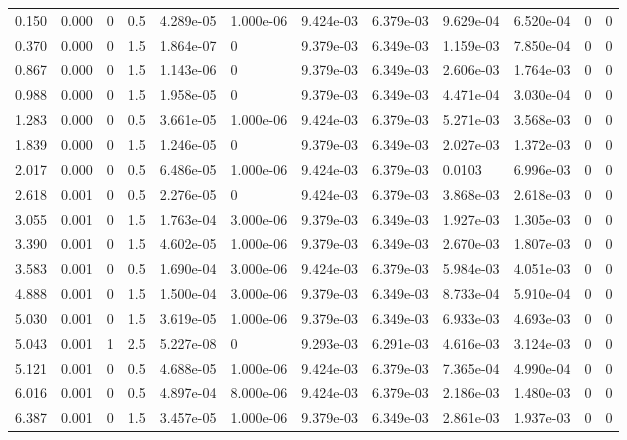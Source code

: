 \documentclass[preview]{standalone}
\begin{document}
{{\begin{tabular}{L{1.2cm}C{1.2cm} C{0.3cm}C{0.5cm} C{1.4cm}C{1.4cm} C{1.4cm}C{1.4cm} C{1.6cm}C{1.6cm} C{1.6cm}C{1.6cm}}
  0.150  &  0.000  & 0     & 0.5 &  4.289e-05  & 1.000e-06  &  9.424e-03&   6.379e-03& 9.629e-04 & 6.520e-04   &  0 & 0  \\ 
  0.370  &  0.000  & 0     & 1.5 &  1.864e-07  & 0  &  9.379e-03&   6.349e-03& 1.159e-03 & 7.850e-04   &  0 & 0  \\ 
  0.867  &  0.000  & 0     & 1.5 &  1.143e-06  & 0  &  9.379e-03&   6.349e-03& 2.606e-03 & 1.764e-03   &  0 & 0  \\ 
  0.988  &  0.000  & 0     & 1.5 &  1.958e-05  & 0  &  9.379e-03&   6.349e-03& 4.471e-04 & 3.030e-04   &  0 & 0  \\ 
  1.283  &  0.000  & 0     & 0.5 &  3.661e-05  & 1.000e-06  &  9.424e-03&   6.379e-03& 5.271e-03 & 3.568e-03   &  0 & 0  \\ 
  1.839  &  0.000  & 0     & 1.5 &  1.246e-05  & 0  &  9.379e-03&   6.349e-03& 2.027e-03 & 1.372e-03   &  0 & 0  \\ 
  2.017  &  0.000  & 0     & 0.5 &  6.486e-05  & 1.000e-06  &  9.424e-03&   6.379e-03& 0.0103 & 6.996e-03   &  0 & 0  \\ 
  2.618  &  0.001  & 0     & 0.5 &  2.276e-05  & 0  &  9.424e-03&   6.379e-03& 3.868e-03 & 2.618e-03   &  0 & 0  \\ 
  3.055  &  0.001  & 0     & 1.5 &  1.763e-04  & 3.000e-06  &  9.379e-03&   6.349e-03& 1.927e-03 & 1.305e-03   &  0 & 0  \\ 
  3.390  &  0.001  & 0     & 1.5 &  4.602e-05  & 1.000e-06  &  9.379e-03&   6.349e-03& 2.670e-03 & 1.807e-03   &  0 & 0  \\ 
  3.583  &  0.001  & 0     & 0.5 &  1.690e-04  & 3.000e-06  &  9.424e-03&   6.379e-03& 5.984e-03 & 4.051e-03   &  0 & 0  \\ 
  4.888  &  0.001  & 0     & 1.5 &  1.500e-04  & 3.000e-06  &  9.379e-03&   6.349e-03& 8.733e-04 & 5.910e-04   &  0 & 0  \\ 
  5.030  &  0.001  & 0     & 1.5 &  3.619e-05  & 1.000e-06  &  9.379e-03&   6.349e-03& 6.933e-03 & 4.693e-03   &  0 & 0  \\ 
  5.043  &  0.001  & 1     & 2.5 &  5.227e-08  & 0  &  9.293e-03&   6.291e-03& 4.616e-03 & 3.124e-03   &  0 & 0  \\ 
  5.121  &  0.001  & 0     & 0.5 &  4.688e-05  & 1.000e-06  &  9.424e-03&   6.379e-03& 7.365e-04 & 4.990e-04   &  0 & 0  \\ 
  6.016  &  0.001  & 0     & 0.5 &  4.897e-04  & 8.000e-06  &  9.424e-03&   6.379e-03& 2.186e-03 & 1.480e-03   &  0 & 0  \\ 
  6.387  &  0.001  & 0     & 1.5 &  3.457e-05  & 1.000e-06  &  9.379e-03&   6.349e-03& 2.861e-03 & 1.937e-03   &  0 & 0  \\ 

\end{tabular}}}
\end{document}
